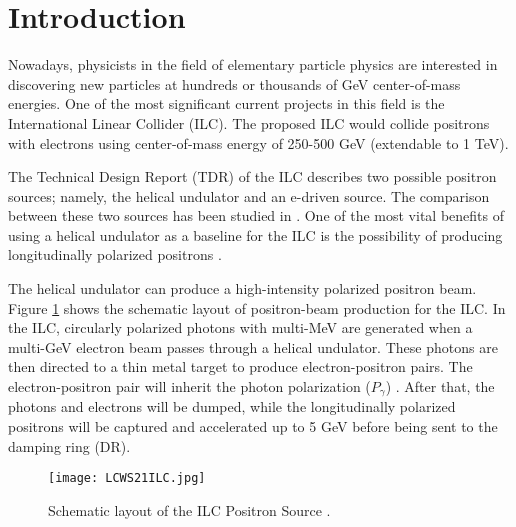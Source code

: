 \documentclass[a4paper]{article}
\begin{document}
\newpage






\fontsize{12}{22}\selectfont
\section{Introduction}

Nowadays, physicists in the field of elementary particle physics are interested in discovering new particles at hundreds or thousands of GeV center-of-mass energies. One of the most significant current projects in this field is the International Linear Collider (ILC). The proposed ILC would collide positrons with electrons using center-of-mass energy of 250-500 GeV (extendable to 1 TeV). 

The Technical Design Report (TDR) \cite{adolphsen2013international} of the ILC describes two possible positron sources; namely, the helical undulator and an e-driven source. The comparison between these two sources has been studied in \cite{TDR2018}. One of the most vital benefits of using a helical undulator as a baseline for the ILC is the possibility of producing longitudinally polarized positrons \cite{moortgat2008polarized}. 

The helical undulator can produce a high-intensity polarized positron beam. Figure \ref{fig:ILC} shows the schematic layout of positron-beam production for the ILC. In the ILC, circularly polarized photons with multi-MeV are generated when a multi-GeV electron beam passes through a helical undulator. These photons are then directed to a thin metal target to produce electron-positron pairs. The electron-positron pair will inherit the photon polarization ($P_\gamma$) \cite {flottmann1993investigations}. After that, the photons and electrons will be dumped, while the longitudinally polarized positrons will be captured and accelerated up to 5 GeV before being sent to the damping ring (DR).





\begin{figure}[h]
\centering
\texttt{[image: LCWS21ILC.jpg]}
\caption{Schematic layout of the ILC Positron Source \cite{adolphsen2013international}.}
\label{fig:ILC}
\end{figure}
\end{document}
